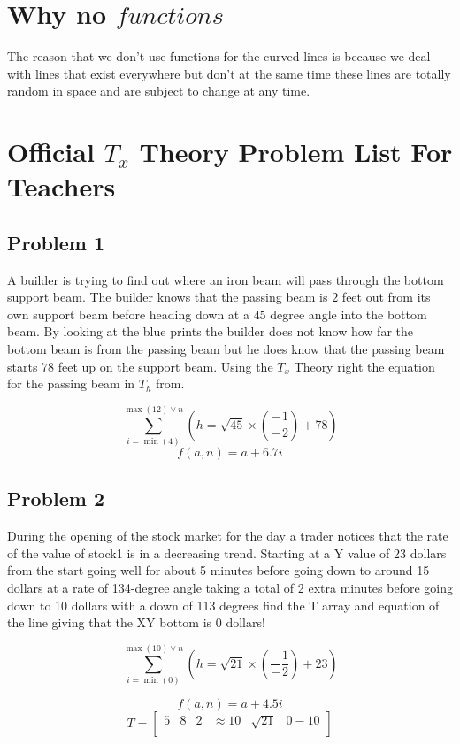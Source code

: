 \documentclass{article}
\begin{document}
\section{Why no \(functions\)}

The reason that we don't use functions for the curved lines is because we deal with lines that exist everywhere but don't at the same time these lines are totally random in space and are subject to change at any time. 

\section{Official \(T_x\) Theory Problem List For Teachers}


\subsection{Problem 1}
A builder is trying to find out where an iron beam will pass through the bottom support beam. The builder knows that the passing beam is \(2\) feet out from its own support beam before heading down at a \(45\) degree angle into the bottom beam. By looking at the blue prints the builder does not know how far the bottom beam is from the passing beam but he does know that the passing beam starts \(78\) feet up on the support beam. Using the \(T_x\) Theory right the equation for the passing beam in \(T_h\) from.

\[
\sum_{i=\min(4)}^{\max(12) \vee n} \left( h = \sqrt{45} \times \left( \frac{-}{-} \frac{1}{2} \right) + 78 \right)
\]
\[
f(a, n) = a + 6.7i
\]

\subsection{Problem 2}
During the opening of the stock market for the day a trader notices that the rate of the value of stock1 is in a decreasing trend. Starting at a Y value of 23 dollars from the start going well for about 5 minutes before going down to around 15 dollars at a rate of 134-degree angle taking a total of 2 extra minutes before going down to 10 dollars with a down of 113 degrees find the T array and equation of the line giving that the XY bottom is 0 dollars!


\[
\sum_{i=\min(0)}^{\max(10) \vee n} \left( h = \sqrt{21} \times \left( \frac{-}{-} \frac{1}{2} \right) + 23 \right)
\]

\[
f(a, n) = a + 4.5i
\]
\[
T = \begin{bmatrix}
    5 & 8 & 2 & \approx 10 & \sqrt{21} & 0-10 \\
\end{bmatrix}
\]
\end{document}
